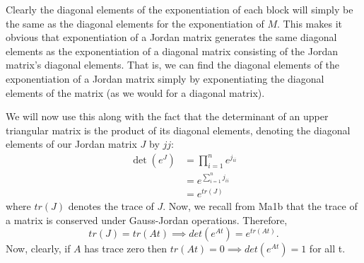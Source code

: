 \documentclass[11pt]{article}
\begin{document}
Clearly the diagonal elements of the exponentiation of each block will simply be the same as the diagonal elements for the exponentiation of $M$. This makes it obvious that exponentiation of a Jordan matrix generates the same diagonal elements as the exponentiation of a diagonal matrix consisting of the Jordan matrix's diagonal elements. That is, we can find the diagonal elements of the exponentiation of a Jordan matrix simply by exponentiating the diagonal elements of the matrix (as we would for a diagonal matrix).

We will now use this along with the fact that the determinant of an upper triangular matrix is the product of its diagonal elements, denoting the diagonal elements of our Jordan matrix $J$ by $jj$:
\begin{align*}
\det(e^J) &=\prod_{i=1}^n e^{j_{ii}}\\
&=e^{\sum_{i=1}^n{j_{ii}}}\\
&=e^{tr(J)}
\end{align*}
where $tr(J)$ denotes the trace of $J$. Now, we recall from Ma1b that the trace of a matrix is conserved under Gauss-Jordan operations. Therefore,
\[
tr(J) = tr(At) \implies det(e^{At}) = e^{tr(At)}.
\]
Now, clearly, if $A$ has trace zero then $tr(At) = 0 \implies det(e^{At}) = 1$ for all t.
\end{document}
